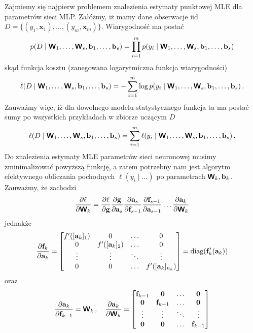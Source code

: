 \documentclass{myclass}
\begin{document}
Zajmiemy się najpierw problemem znalezienia estymaty punktowej MLE dla parametrów sieci MLP.
Załóżmy, iż mamy dane obserwacje iid \(D = \{(y_1, \mathbf{x}_1), \ldots, (y_m, \mathbf{x}_m)\}\).
Wiarygodność ma postać
\begin{equation*}
p(D \mid \boldsymbol{\mathsf{W}}_1, \ldots,\boldsymbol{\mathsf{W}}_s, \mathbf{b}_1, \ldots, \mathbf{b}_s ) = \prod_{i=1}^m p(y_i \mid \boldsymbol{\mathsf{W}}_1, \ldots,\boldsymbol{\mathsf{W}}_s, \mathbf{b}_1, \ldots, \mathbf{b}_s)
\end{equation*}
skąd funkcja kosztu (zanegowana logarytmiczna funkcja wiarygodności)
\begin{equation*}
    \ell(D \mid \boldsymbol{\mathsf{W}}_1, \ldots,\boldsymbol{\mathsf{W}}_s, \mathbf{b}_1, \ldots, \mathbf{b}_s) = -\sum_{i=1}^m \log p(y_i \mid \boldsymbol{\mathsf{W}}_1, \ldots,\boldsymbol{\mathsf{W}}_s, \mathbf{b}_1, \ldots, \mathbf{b}_s)\,.
\end{equation*}
Zauważmy więc, iż dla dowolnego modelu statystycznego funkcja ta ma postać sumy po wszystkich
przykładach w zbiorze uczącym \(D\)
\begin{equation*}
    \ell(D \mid \boldsymbol{\mathsf{W}}_1, \ldots,\boldsymbol{\mathsf{W}}_s, \mathbf{b}_1, \ldots, \mathbf{b}_s) = \sum_{i=1}^m \ell(y_i \mid \boldsymbol{\mathsf{W}}_1, \ldots,\boldsymbol{\mathsf{W}}_s, \mathbf{b}_1, \ldots, \mathbf{b}_s)\,.
\end{equation*}
Do znalezienia estymaty MLE parametrów sieci neuronowej musimy zminimalizować powyższą funkcję, a
zatem potrzebny nam jest algorytm efektywnego obliczania pochodnych \(\ell(y_i \mid \ldots)\) po
parametrach \(\boldsymbol{\mathsf{W}}_k, \mathbf{b}_k\). Zauważmy, że zachodzi
\begin{equation*}
    \pdv{\ell}{\boldsymbol{\mathsf{W}}_k} = \pdv{\ell}{\mathbf{g}}\pdv{\mathbf{g}}{\mathbf{a}_s}\pdv{\mathbf{a}_s}{\mathbf{f}_{s-1}}\pdv{\mathbf{f}_{s-1}}{\mathbf{a}_{s-1}}\ldots \pdv{\mathbf{a}_k}{\boldsymbol{\mathsf{W}}_k}
\end{equation*}
jednakże
\begin{equation*}
    \pdv{\mathbf{f}_k}{\mathbf{a}_k} = \mqty[f'([\mathbf{a}_k]_1) & 0 & \ldots & 0 \\ 0 & f'([\mathbf{a}_k]_2) & \ldots & 0 \\ \vdots & \vdots & \ddots & \vdots \\ 0 & 0 & \ldots & f'([\mathbf{a}_k]_{n_k})] = \diag(\mathbf{f}'_k(\mathbf{a}_k))
\end{equation*}
oraz
\begin{equation*}
    \pdv{\mathbf{a}_k}{\mathbf{f}_{k-1}} = \oper{W}_k\,,\quad \pdv{\mathbf{a}_k}{\oper{W}_k} = \mqty[\mathbf{f}_{k-1} & \mathbf{0} & \ldots & \mathbf{0} \\ \mathbf{0} & \mathbf{f}_{k-1} & \ldots & \mathbf{0} \\ \vdots & \vdots & \ddots & \vdots \\ \mathbf{0} & \mathbf{0} & \ldots & \mathbf{f}_{k-1}]
\end{equation*}
\end{document}
